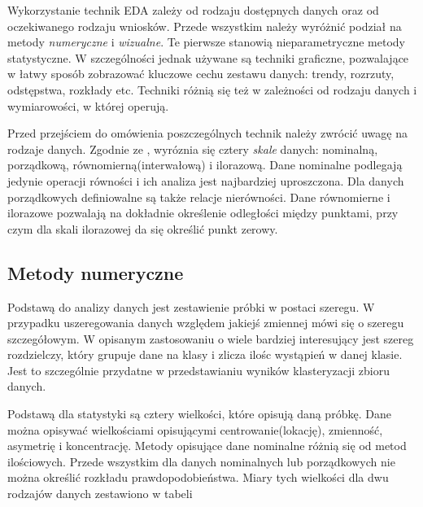 \documentclass[12pt,a4paper,oneside]{report} %
\begin{document}
Wykorzystanie technik EDA zależy od rodzaju dostępnych danych oraz od oczekiwanego rodzaju wniosków. Przede wszystkim należy wyróżnić podział na metody \emph{numeryczne} i \emph{wizualne}. Te pierwsze stanowią nieparametryczne metody statystyczne. W szczególności jednak używane są techniki graficzne, pozwalające w łatwy sposób zobrazować kluczowe cechu zestawu danych: trendy, rozrzuty, odstępstwa, rozkłady etc. Techniki różnią się też w zależności od rodzaju danych i wymiarowości, w której operują.\par

Przed przejściem do omówienia poszczególnych technik należy zwrócić uwagę na rodzaje danych. Zgodnie ze \cite{stanisz-1}, wyróznia się cztery \emph{skale} danych: nominalną, porządkową, równomierną(interwałową) i ilorazową. Dane nominalne podlegają jedynie operacji równości i ich analiza jest najbardziej uproszczona. Dla danych porządkowych definiowalne są także relacje nierówności. Dane równomierne i ilorazowe pozwalają na dokładnie określenie odległości między punktami, przy czym dla skali ilorazowej da się określić punkt zerowy.\par

\subsection{Metody numeryczne}

Podstawą do analizy danych jest zestawienie próbki w postaci szeregu. W przypadku uszeregowania danych względem jakiejś zmiennej mówi się o szeregu szczegółowym. W opisanym zastosowaniu o wiele bardziej interesujący jest szereg rozdzielczy, który grupuje dane na klasy i zlicza ilośc wystąpień w danej klasie. Jest to szczególnie przydatne w przedstawianiu wyników klasteryzacji zbioru danych. \par

Podstawą dla statystyki są cztery wielkości, które opisują daną próbkę. Dane można opisywać wielkościami opisującymi centrowanie(lokację), zmienność, asymetrię i koncentrację. \cite{stanisz-1} Metody opisujące dane nominalne różnią się od metod ilościowych. Przede wszystkim dla danych nominalnych lub porządkowych nie można określić rozkładu prawdopodobieństwa. Miary tych wielkości dla dwu rodzajów danych zestawiono w tabeli \cite{miary-statystyczne} 
\end{document}
